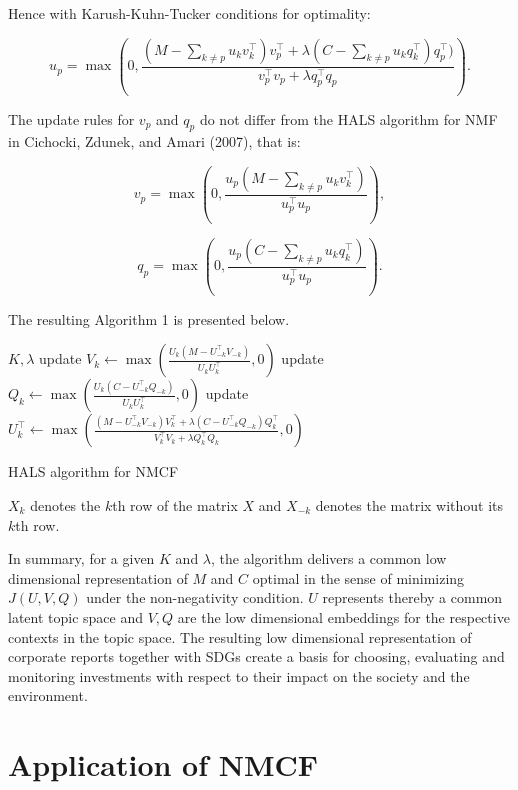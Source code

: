 \documentclass[
]{article}
\begin{document}
Hence with Karush-Kuhn-Tucker conditions for optimality:

\[u_p = \max\left(0, \frac{(M-\sum_{k\not=p} u_kv_k^\top)v_p^\top + \lambda (C-\sum_{k\not=p} u_kq_k^\top)q_p^\top)}{v_p^\top v_p + \lambda q_p^\top q_p}\right).\]

The update rules for \(v_p\) and \(q_p\) do not differ from the HALS algorithm for NMF in Cichocki, Zdunek, and Amari (2007), that is:

\[v_p = \max\left(0, \frac{u_p(M-\sum_{k\not=p} u_kv_k^\top)}{u_p^\top u_p}\right),\]

\[q_p = \max\left(0, \frac{u_p(C-\sum_{k\not=p} u_kq_k^\top)}{u_p^\top u_p}\right).\]

The resulting Algorithm 1 is presented below.

\begin{algorithm}[H]
\begin{algorithmic}
\REQUIRE $K, \lambda$
\STATE update $V_k\leftarrow \max\left(\frac{U_k(M-U_{-k}^\top V_{-k})}{U_kU_k^\top },0\right)$
\STATE update $Q_k\leftarrow \max\left(\frac{U_k(C-U_{-k}^\top Q_{-k})}{U_kU_k^\top},0\right)$
\STATE update $U_k^\top \leftarrow \max\left(\frac{(M-U_{-k}^\top V_{-k})V_k^\top + \lambda (C-U_{-k}^\top Q_{-k})Q_k^\top}{ V_k^\top V_k  + \lambda Q_k^\top Q_k },0\right)$
\ENDFOR
\ENDWHILE
\end{algorithmic}
\caption{HALS algorithm for NMCF}
\end{algorithm}

\(X_k\) denotes the \(k\)th row of the matrix \(X\) and \(X_{-k}\) denotes the matrix without its \(k\)th row.

In summary, for a given \(K\) and \(\lambda\), the algorithm delivers a common low dimensional representation of \(M\) and \(C\) optimal in the sense of minimizing \(J(U,V,Q)\) under the non-negativity condition. \(U\) represents thereby a common latent topic space and \(V,Q\) are the low dimensional embeddings for the respective contexts in the topic space. The resulting low dimensional representation of corporate reports together with SDGs create a basis for choosing, evaluating and monitoring investments with respect to their impact on the society and the environment.

\hypertarget{application-of-nmcf}{%
\section{Application of NMCF}\label{application-of-nmcf}}
\end{document}
